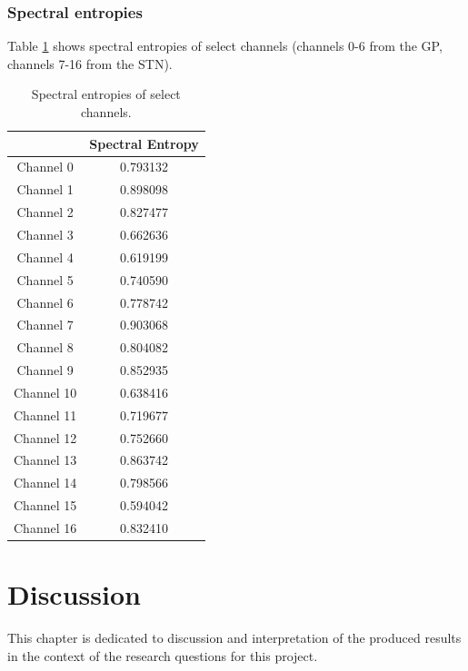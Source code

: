 \documentclass{kththesis}
\begin{document}
\subsection{Spectral entropies}

Table \ref{tab:spec_entr} shows spectral entropies of select channels (channels 0-6 from the GP, channels 7-16 from the STN).

\begin{table}[H]
    \centering
    \begin{tabular}{|c|c|}
    \hline
                & Spectral Entropy \\ \hline
     Channel 0  & 0.793132         \\ \hline
     Channel 1  & 0.898098         \\ \hline
     Channel 2  & 0.827477         \\ \hline
     Channel 3  & 0.662636         \\ \hline
     Channel 4  & 0.619199         \\ \hline
     Channel 5  & 0.740590         \\ \hline
     Channel 6  & 0.778742         \\ \hline
     Channel 7  & 0.903068         \\ \hline
     Channel 8  & 0.804082         \\ \hline
     Channel 9  & 0.852935         \\ \hline
     Channel 10 & 0.638416         \\ \hline
     Channel 11 & 0.719677         \\ \hline
     Channel 12 & 0.752660         \\ \hline
     Channel 13 & 0.863742         \\ \hline
     Channel 14 & 0.798566         \\ \hline
     Channel 15 & 0.594042         \\ \hline
     Channel 16 & 0.832410         \\ \hline
    \end{tabular}
    \caption{Spectral entropies of select channels.}
    \label{tab:spec_entr}
\end{table}

\newpage
\chapter{Discussion}

This chapter is dedicated to discussion and interpretation of the produced results in the context of the research questions for this project.
\end{document}
